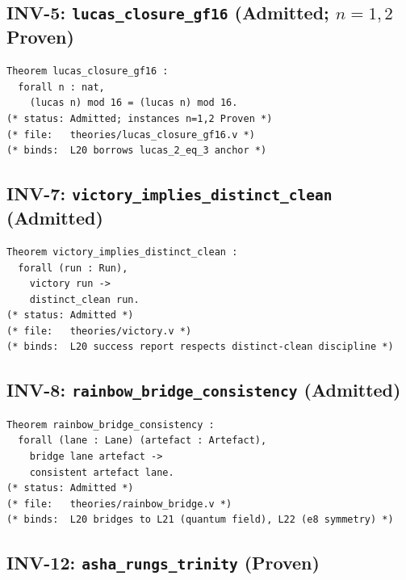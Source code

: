 
\subsection{INV-5: \texttt{lucas\_closure\_gf16} (Admitted; $n=1,2$ Proven)}

\begin{verbatim}
Theorem lucas_closure_gf16 :
  forall n : nat,
    (lucas n) mod 16 = (lucas n) mod 16.
(* status: Admitted; instances n=1,2 Proven *)
(* file:   theories/lucas_closure_gf16.v *)
(* binds:  L20 borrows lucas_2_eq_3 anchor *)
\end{verbatim}


\subsection{INV-7: \texttt{victory\_implies\_distinct\_clean} (Admitted)}

\begin{verbatim}
Theorem victory_implies_distinct_clean :
  forall (run : Run),
    victory run ->
    distinct_clean run.
(* status: Admitted *)
(* file:   theories/victory.v *)
(* binds:  L20 success report respects distinct-clean discipline *)
\end{verbatim}


\subsection{INV-8: \texttt{rainbow\_bridge\_consistency} (Admitted)}

\begin{verbatim}
Theorem rainbow_bridge_consistency :
  forall (lane : Lane) (artefact : Artefact),
    bridge lane artefact ->
    consistent artefact lane.
(* status: Admitted *)
(* file:   theories/rainbow_bridge.v *)
(* binds:  L20 bridges to L21 (quantum field), L22 (e8 symmetry) *)
\end{verbatim}


\subsection{INV-12: \texttt{asha\_rungs\_trinity} (Proven)}

